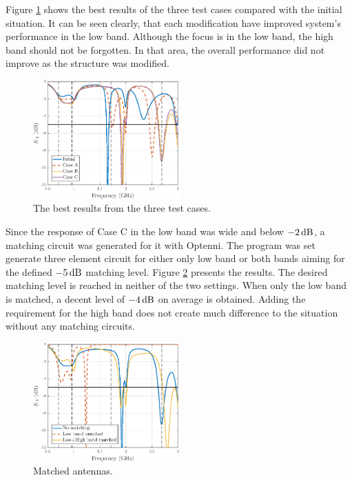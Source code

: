 Figure \ref{fig:concept2} shows the best results of the three test cases compared with the initial situation. It can be seen clearly, that each modification have improved system's performance in the low band. Although the focus is in the low band, the high band should not be forgotten. In that area, the overall performance did not improve as the structure was modified. 
\begin{figure}[H]
    \centering
    \includegraphics[width=0.5\textwidth]{img/concept2.eps}
    \caption{The best results from the three test cases.}
    \label{fig:concept2}
\end{figure}

Since the response of Case C in the low band was wide and below $-2\,\mathrm{dB}$, a matching circuit was generated for it with Optenni. The program was set generate three element circuit for either only low band or both bands aiming for the defined $-5\,\mathrm{dB}$ matching level. Figure \ref{fig:concept2_match} presents the results. The desired matching level is reached in neither of the two settings. When only the low band is matched, a decent level of $-4\,\mathrm{dB}$ on average is obtained. Adding the requirement for the high band does not create much difference to the situation without any matching circuits. 
\begin{figure}[H]
    \centering
    \includegraphics[width=0.5\textwidth]{img/concept2_match.eps}
    \caption{Matched antennas.}
    \label{fig:concept2_match}
\end{figure}

